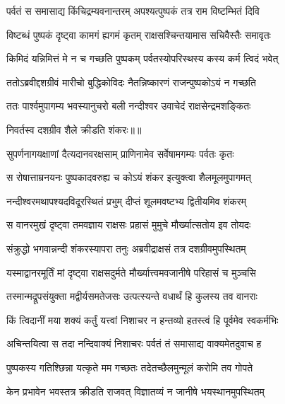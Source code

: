 \twolineshloka
{पर्वतं स समासाद्य किंचिद्रम्यवनान्तरम्}
{अपश्यत्पुष्पकं तत्र राम विष्टम्भितं दिवि} %

\twolineshloka
{विष्टब्धं पुष्पकं दृष्ट्वा कामगं ह्यगमं कृतम्}
{राक्षसश्चिन्तयामास सचिवैस्तैः समावृतः} %

\twolineshloka
{किमिदं यन्निमित्तं मे न च गच्छति पुष्पकम्}
{पर्वतस्योपरिस्थस्य कस्य कर्म त्विदं भवेत्} %

\twolineshloka
{ततोऽब्रवीद्दशग्रीवं मारीचो बुद्धिकोविदः}
{नैतन्निष्कारणं राजन्पुष्पकोऽयं न गच्छति} %

\twolineshloka
{ततः पार्श्वमुपागम्य भवस्यानुचरो बली}
{नन्दीश्वर उवाचेदं राक्षसेन्द्रमशङ्कितः} %

{निवर्तस्व दशग्रीव शैले क्रीडति शंकरः॥॥} %

\addtocounter{shlokacount}{1}

\twolineshloka
{सुपर्णनागयक्षाणां दैत्यदानवरक्षसाम्}
{प्राणिनामेव सर्वेषामगम्यः पर्वतः कृतः} %

\twolineshloka
{स रोषात्ताम्रनयनः पुष्पकादवरुह्य च}
{कोऽयं शंकर इत्युक्त्वा शैलमूलमुपागमत्} %

\twolineshloka
{नन्दीश्वरमथापश्यदविदूरस्थितं प्रभुम्}
{दीप्तं शूलमवष्टभ्य द्वितीयमिव शंकरम्} %

\twolineshloka
{स वानरमुखं दृष्ट्वा तमवज्ञाय राक्षसः}
{प्रहासं मुमुचे मौर्ख्यात्सतोय इव तोयदः} %

\twolineshloka
{संक्रुद्धो भगवान्नन्दी शंकरस्यापरा तनुः}
{अब्रवीद्राक्षसं तत्र दशग्रीवमुपस्थितम्} %

\twolineshloka
{यस्माद्वानरमूर्तिं मां दृष्ट्वा राक्षसदुर्मते}
{मौर्ख्यात्त्वमवजानीषे परिहासं च मुञ्चसि} %

\twolineshloka
{तस्मान्मद्रूपसंयुक्ता मद्वीर्यसमतेजसः}
{उत्पत्स्यन्ते वधार्थं हि कुलस्य तव वानराः} %

\twolineshloka
{किं त्विदानीं मया शक्यं कर्तुं यत्त्वां निशाचर}
{न हन्तव्यो हतस्त्वं हि पूर्वमेव स्वकर्मभिः} %

\twolineshloka
{अचिन्तयित्वा स तदा नन्दिवाक्यं निशाचरः}
{पर्वतं तं समासाद्य वाक्यमेतदुवाच ह} %

\twolineshloka
{पुष्पकस्य गतिश्छिन्ना यत्कृते मम गच्छतः}
{तदेतच्छैलमुन्मूलं करोमि तव गोपते} %

\twolineshloka
{केन प्रभावेन भवस्तत्र क्रीडति राजवत्}
{विज्ञातव्यं न जानीषे भयस्थानमुपस्थितम्} %

